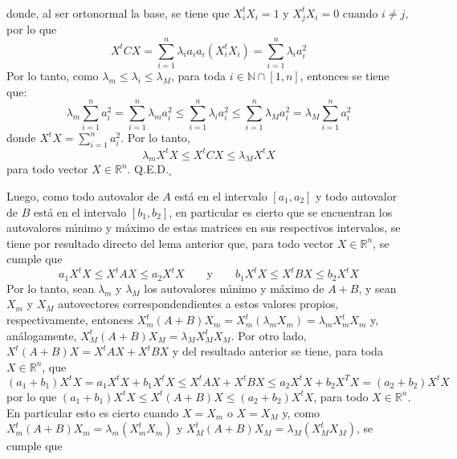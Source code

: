 \begin{solucion}
\begin{demostracion}
\begin{eqnarray*}
  \end{eqnarray*}
  donde, al ser ortonormal la base, se tiene que $X_i^tX_i = 1$ y $X_j^tX_i = 0$ cuando $i\neq j$, por lo que
  \begin{equation*}
   X^tCX = \sum_{i = 1}^n \lambda_i a_i a_i (X_i^tX_i) = \sum_{i=1}^n \lambda_i a_i^2
  \end{equation*}
  Por lo tanto, como $\lambda_m \leq \lambda_i \leq \lambda_M$, para toda $i\in\mathbb{N}\cap[1,n]$, entonces se tiene que:
  \begin{equation*}
   \lambda_m \sum_{i=1}^n a_i^2 =
   \sum_{i=1}^n \lambda_m a_i^2 \leq \sum_{i=1}^n \lambda_i a_i^2 \leq \sum_{i=1}^n \lambda_M a_i^2 = \lambda_M \sum_{i=1}^n a_i^2
  \end{equation*}
  donde $X^tX = \sum_{i=1}^n  a_i^2$. Por lo tanto,
  \begin{equation*}
   \lambda_m X^tX \leq X^tCX \leq \lambda_M X^tX
  \end{equation*}
  para todo vector $X \in \mathbb{R}^n$. Q.E.D.${}_{\square}$
 \end{demostracion}
 Luego, como todo autovalor de $A$ est\'a en el intervalo $[a_1, a_2]$ y todo autovalor de $B$ est\'a en el intervalo $[b_1, b_2]$, en particular es cierto que se encuentran los autovalores m\'{\i}nimo y m\'aximo de estas matrices en sus respectivos intervalos, se tiene por resultado directo del lema anterior que, para todo vector $X\in \mathbb{R}^n$, se cumple que
 \begin{equation*}
  a_1X^tX \leq X^tAX \leq a_2 X^tX \qquad \text{y} \qquad b_1X^tX \leq X^tBX \leq b_2 X^tX
 \end{equation*}
 Por lo tanto, sean $\lambda_m$ y $\lambda_M$ los autovalores m\'{\i}nimo y m\'aximo de $A+B$, y sean $X_m$ y $X_M$ autovectores correspondendientes a estos valores propios, respectivamente, entonces $X_m^t(A+B)X_m = X_m^t\left( \lambda_m X_m \right) = \lambda_m X_m^tX_m$ y, an\'alogamente, $X_M^t(A+B)X_M = \lambda_M X_M^tX_M$. Por otro lado, $X^t(A + B)X = X^tAX + X^tBX$ y del resultado anterior se tiene, para toda $X\in\mathbb{R}^n$, que
 \begin{equation*}
  (a_1+b_1)X^tX = a_1X^tX + b_1X^tX \leq X^tAX + X^tBX \leq a_2 X^tX + b_2X^TX = (a_2 + b_2) X^tX
 \end{equation*}
 por lo que $(a_1+b_1)X^tX \leq X^t(A+B)X \leq (a_2+b_2)X^tX$, para todo $X\in\mathbb{R}^n$.
 En particular esto es cierto cuando $X = X_m$ o $X = X_M$ y, como $X_m^t(A+B)X_m = \lambda_m(X_m^tX_m)$ y $X_M^t(A+B)X_M = \lambda_M(X_M^tX_M)$, se cumple que 

\end{solucion}
